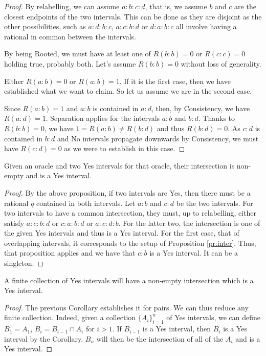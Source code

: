 \documentclass[12pt]{article}
\begin{document}
\begin{proof}
By relabelling, we can assume $a:b:c:d$, that is, we assume $b$ and $c$ are the closest endpoints of the two intervals. This can be done as they are disjoint as the other possibilities, such as $a:d:b:c$, $a:c:b:d$ or $d:a:b:c$ all involve having a rational in common between the intervals.  

By being Rooted, we must have at least one of $R(b:b) = 0$ or $R(c:c) = 0$ holding true, probably both. Let's assume $R(b:b) = 0$ without loss of generality.
 
Either $R(a:b) = 0$ or $R(a:b)=1$. If it is the first case, then we have established what we want to claim. So let us assume we are in the second case. 

Since $R(a:b) = 1$ and $a:b$ is contained in $a:d$, then, by Consistency, we have $R(a:d) = 1$. Separation applies for the intervals $a:b$ and $b:d$. Thanks to $R(b:b) = 0$, we have $1 = R(a:b) \neq R(b:d)$ and thus $R(b:d) = 0$. As $c:d$ is contained in $b:d$ and No intervals propagate downwards by Consistency, we must have $R(c:d)=0$  as we were to establish in this case. 
\end{proof}

\begin{corollary}\label{cor:pair-inter}
    Given an oracle and two Yes intervals for that oracle, their intersection is non-empty and is a Yes interval. 
\end{corollary}

\begin{proof}
    By the above proposition, if two intervals are Yes, then there must be a rational $q$ contained in both intervals. Let $a:b$ and $c:d$ be the two intervals. For two intervals to have a common intersection, they must, up to relabelling,  either satisfy $a:c:b:d$ or $c:a:b:d$ or $a:c:d:b$. For the latter two, the intersection is one of the given Yes intervals and thus is a Yes interval. For the first case, that of overlapping intervals, it corresponds to the setup of Proposition \ref{pr:inter}. Thus, that proposition applies and we have that $c:b$ is a Yes interval. It can be a singleton. 
\end{proof}

\begin{corollary}\label{cor:finite-inter}
    A finite collection of Yes intervals will have a non-empty intersection which is a Yes interval. 
\end{corollary}

\begin{proof}
The previous Corollary establishes it for pairs. We can thus reduce any finite collection. Indeed, given a collection $\{A_i\}_{i=1}^n$ of Yes intervals, we can define $B_1 = A_1$, $B_i = B_{i-1} \cap A_i$ for $i > 1$. If $B_{i-1}$ is a Yes interval, then $B_i$ is a Yes interval by the Corollary. $B_n$ will then be the intersection of all of the $A_i$ and is a Yes interval.  
\end{proof}
\end{document}
